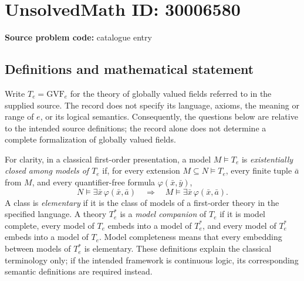 \documentclass[11pt]{article}
\begin{document}
\section*{UnsolvedMath ID: 30006580}
\textbf{Source problem code:} catalogue entry
\subsection{Definitions and mathematical statement}
Write \(T_e=\mathrm{GVF}_e\) for the theory of globally valued fields referred to in the supplied source. The record does not specify its language, axioms, the meaning or range of \(e\), or its logical semantics. Consequently, the questions below are relative to the intended source definitions; the record alone does not determine a complete formalization of globally valued fields.

For clarity, in a classical first-order presentation, a model \(M\models T_e\) is \emph{existentially closed among models of \(T_e\)} if, for every extension \(M\subseteq N\models T_e\), every finite tuple \(\bar a\) from \(M\), and every quantifier-free formula \(\varphi(\bar x,\bar y)\),
\[
N\models\exists\bar x\,\varphi(\bar x,\bar a)
\quad\Longrightarrow\quad
M\models\exists\bar x\,\varphi(\bar x,\bar a).
\]
A class is \emph{elementary} if it is the class of models of a first-order theory in the specified language. A theory \(T_e^*\) is a \emph{model companion} of \(T_e\) if it is model complete, every model of \(T_e\) embeds into a model of \(T_e^*\), and every model of \(T_e^*\) embeds into a model of \(T_e\). Model completeness means that every embedding between models of \(T_e^*\) is elementary. These definitions explain the classical terminology only; if the intended framework is continuous logic, its corresponding semantic definitions are required instead.
\end{document}
